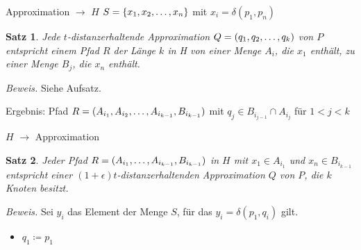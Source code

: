 \documentclass{beamer}
\newtheorem{thm}{Satz}
\begin{document}
	\begin{frame}{Approximation $\rightarrow$ $H$}
		$S = \{x_1, x_2, \mathellipsis, x_n\}$ mit $x_i = \delta(p_1, p_n)$
		\begin{thm}
			Jede $t$-distanzerhaltende Approximation $Q = (q_1, q_2, \mathellipsis, q_k)$ von $P$ entspricht einem Pfad $R$ der Länge $k$ in H von einer Menge $A_i$, die $x_1$ enthält, zu einer Menge $B_j$, die $x_n$ enthält.
		\end{thm}
		\textit{Beweis.} Siehe Aufsatz.
		
		\vspace{5px}
		Ergebnis: Pfad $R = (A_{i_1}, A_{i_2}, \mathellipsis, A_{i_{k-1}}, B_{i_{k-1}})$ mit $q_j \in B_{i_{j-1}} \cap A_{i_j}$ für $1 < j < k$
		
%		
%			
	\end{frame}
	
%		
%	
	
	\begin{frame}{$H$ $\rightarrow$ Approximation}
		\begin{thm}
			Jeder Pfad $R = (A_{i_1}, \mathellipsis, A_{i_{k-1}}, B_{i_{k-1}})$ in $H$ mit $x_1 \in A_{i_1}$ und $x_n \in B_{i_{k-1}}$ entspricht einer $(1+\epsilon)t$-distanzerhaltenden Approximation $Q$ von $P$, die $k$ Knoten besitzt.
		\end{thm}
		\textit{Beweis.}
		Sei $y_i$ das Element der Menge $S$, für das $y_i = \delta(p_1, q_i)$ gilt.
		\begin{itemize}
			\item $q_1 \coloneqq p_1$
		\end{itemize}
	\end{frame}
	
\end{document}
